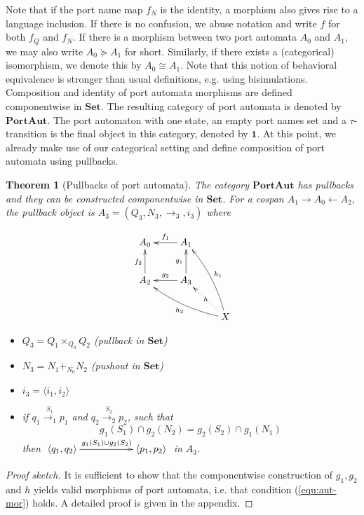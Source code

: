\documentclass[copyright,creativecommons]{eptcs}
\newtheorem{theorem}{Theorem}
\newcommand{\Set}{\ensuremath{\mathbf{Set}}}
\newcommand{\PA}{\ensuremath{\mathbf{PortAut}}}
\newcommand{\one}{\ensuremath{\mathbf{1}}}
\begin{document}
\vfill

Note that if the port name map $f_N$ is the identity, a morphism also gives
rise to a language inclusion. If there is no confusion, we abuse notation and
write $f$ for both $f_Q$ and $f_N$.
If there is a morphism between two port automata $A_0$ and $A_1$, we
may also write $A_0\succeq A_1$ for short.
Similarly, if there exists a (categorical) isomorphism, we denote
this by $A_0 \cong A_1$. Note that this notion of behavioral equivalence is
stronger than usual definitions, e.g. using bisimulations.
\vfill
Composition and identity of port automata morphisms are defined
componentwise in \Set. The resulting category of port automata is denoted by
{\PA}. The port automaton with one state, an empty port names set and
a $\tau$-transition is the final object in this category, denoted by $\one$.
At this point, we already make use of our categorical setting
and define composition of port automata using pullbacks.

\newpage
\begin{theorem}[Pullbacks of port automata]
\label{thm:pullbacks}
The category $\PA$ has pullbacks and they can be constructed componentwise
in \Set. For a cospan $A_1 \to A_0 \leftarrow A_2$, the pullback object
is $A_3 = (Q_3, N_3, \to_3, i_3)$ where\\
\begin{minipage}{0.3\textwidth}
\[\xymatrix{
  A_0 &	
  A_1 \ar[l]_{f_1} \\
  A_2 \ar[u]^{f_2}  & 
  A_3 \ar[u]^{g_1} 	\ar[l]_{g_2} \\ & & 
  X \ar@/_/[uul]_{h_1} \ar@/^/[ull]^{h_2} \ar@{.>}[ul]|-{h}
  }\]
\vspace{3mm}
\end{minipage}
\hfill
\begin{minipage}{0.65\textwidth}
\begin{itemize}
\item $Q_3 = Q_1 \times_{Q_0} Q_2$ (pullback in \Set)
\item $N_3 = N_1 +_{N_0} N_2$ (pushout in \Set)
\item $i_3 = \langle i_1,i_2\rangle$
\item if $q_1 \overset{S_1}{\longrightarrow_1} p_1$ and $q_2 \overset{S_2}{\longrightarrow_2} p_2$,
such that
\begin{equation}
	\label{equ:caut-po}
	g_1(S_1) \cap g_2(N_2) = g_2(S_2) \cap g_1(N_1) 
\end{equation}
then
	$\xymatrix{
	\langle q_1,q_2 \rangle 
	\ar[rr]^{g_1(S_1) \cup g_2(S_2)} &&
	\langle p_1,p_2 \rangle
	}$
in $A_3$.
\end{itemize}
\end{minipage}
\end{theorem}
\begin{proof}[Proof sketch]
It is sufficient to show that the componentwise construction of $g_1,g_2$ and
$h$ yields valid morphisms of port automata, i.e. that
condition (\ref{equ:aut-mor}) holds. A detailed proof is
given in the appendix.
\end{proof}
\end{document}
